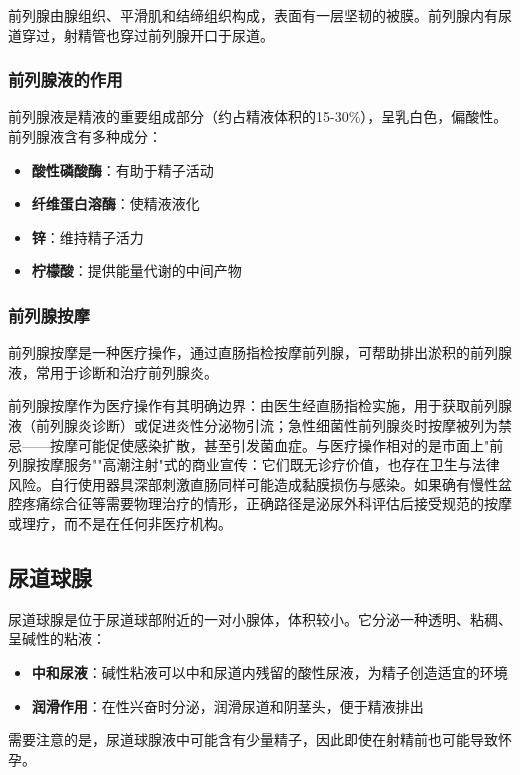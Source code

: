 前列腺由腺组织、平滑肌和结缔组织构成，表面有一层坚韧的被膜。前列腺内有尿道穿过，射精管也穿过前列腺开口于尿道。

\subsubsection{前列腺液的作用}

前列腺液是精液的重要组成部分（约占精液体积的15-30\%），呈乳白色，偏酸性。前列腺液含有多种成分：
\begin{itemize}
    \item \textbf{酸性磷酸酶}：有助于精子活动
    \item \textbf{纤维蛋白溶酶}：使精液液化
    \item \textbf{锌}：维持精子活力
    \item \textbf{柠檬酸}：提供能量代谢的中间产物
\end{itemize}

\subsubsection{前列腺按摩}

前列腺按摩是一种医疗操作，通过直肠指检按摩前列腺，可帮助排出淤积的前列腺液，常用于诊断和治疗前列腺炎。


前列腺按摩作为医疗操作有其明确边界：由医生经直肠指检实施，用于获取前列腺液（前列腺炎诊断）或促进炎性分泌物引流；急性细菌性前列腺炎时按摩被列为禁忌——按摩可能促使感染扩散，甚至引发菌血症。与医疗操作相对的是市面上"前列腺按摩服务""高潮注射"式的商业宣传：它们既无诊疗价值，也存在卫生与法律风险。自行使用器具深部刺激直肠同样可能造成黏膜损伤与感染。如果确有慢性盆腔疼痛综合征等需要物理治疗的情形，正确路径是泌尿外科评估后接受规范的按摩或理疗，而不是在任何非医疗机构。

\subsection{尿道球腺}

尿道球腺是位于尿道球部附近的一对小腺体，体积较小。它分泌一种透明、粘稠、呈碱性的粘液：
\begin{itemize}
    \item \textbf{中和尿液}：碱性粘液可以中和尿道内残留的酸性尿液，为精子创造适宜的环境
    \item \textbf{润滑作用}：在性兴奋时分泌，润滑尿道和阴茎头，便于精液排出
\end{itemize}

需要注意的是，尿道球腺液中可能含有少量精子，因此即使在射精前也可能导致怀孕。


